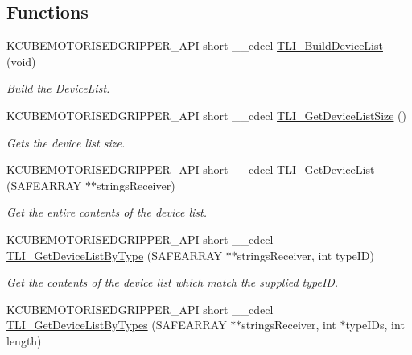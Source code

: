 \subsection*{Functions}
\begin{DoxyCompactItemize}
\item 
K\+C\+U\+B\+E\+M\+O\+T\+O\+R\+I\+S\+E\+D\+G\+R\+I\+P\+P\+E\+R\+\_\+\+A\+PI short \+\_\+\+\_\+cdecl \hyperlink{group___k_cube_motorised_gripper_ga1083ffa4b571402e5a033da8892a6272}{T\+L\+I\+\_\+\+Build\+Device\+List} (void)
\begin{DoxyCompactList}\small\item\em Build the Device\+List. \end{DoxyCompactList}\item 
K\+C\+U\+B\+E\+M\+O\+T\+O\+R\+I\+S\+E\+D\+G\+R\+I\+P\+P\+E\+R\+\_\+\+A\+PI short \+\_\+\+\_\+cdecl \hyperlink{group___k_cube_motorised_gripper_gaf02a23fc275b8ef660bd4fb735189466}{T\+L\+I\+\_\+\+Get\+Device\+List\+Size} ()
\begin{DoxyCompactList}\small\item\em Gets the device list size. \end{DoxyCompactList}\item 
K\+C\+U\+B\+E\+M\+O\+T\+O\+R\+I\+S\+E\+D\+G\+R\+I\+P\+P\+E\+R\+\_\+\+A\+PI short \+\_\+\+\_\+cdecl \hyperlink{group___k_cube_motorised_gripper_gaa895ad8a5ba2a53155406a6046fc6e4f}{T\+L\+I\+\_\+\+Get\+Device\+List} (S\+A\+F\+E\+A\+R\+R\+AY $\ast$$\ast$strings\+Receiver)
\begin{DoxyCompactList}\small\item\em Get the entire contents of the device list. \end{DoxyCompactList}\item 
K\+C\+U\+B\+E\+M\+O\+T\+O\+R\+I\+S\+E\+D\+G\+R\+I\+P\+P\+E\+R\+\_\+\+A\+PI short \+\_\+\+\_\+cdecl \hyperlink{group___k_cube_motorised_gripper_ga1060d9ddb9a6614c54bacf0025311784}{T\+L\+I\+\_\+\+Get\+Device\+List\+By\+Type} (S\+A\+F\+E\+A\+R\+R\+AY $\ast$$\ast$strings\+Receiver, int type\+ID)
\begin{DoxyCompactList}\small\item\em Get the contents of the device list which match the supplied type\+ID. \end{DoxyCompactList}\item 
K\+C\+U\+B\+E\+M\+O\+T\+O\+R\+I\+S\+E\+D\+G\+R\+I\+P\+P\+E\+R\+\_\+\+A\+PI short \+\_\+\+\_\+cdecl \hyperlink{group___k_cube_motorised_gripper_ga4e32580735ac15a093dcf64e97db6932}{T\+L\+I\+\_\+\+Get\+Device\+List\+By\+Types} (S\+A\+F\+E\+A\+R\+R\+AY $\ast$$\ast$strings\+Receiver, int $\ast$type\+I\+Ds, int length)
$$
\end{DoxyCompactItemize}
